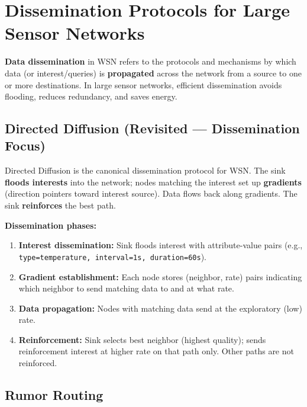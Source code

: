\documentclass[12pt,a4paper]{article}
\begin{document}
\section{Dissemination Protocols for Large Sensor Networks}

\begin{tcolorbox}[defbox, title={\textbf{Data Dissemination --- Definition}}]
\textbf{Data dissemination} in WSN refers to the protocols and mechanisms by which data (or interest/queries) is \textbf{propagated} across the network from a source to one or more destinations. In large sensor networks, efficient dissemination avoids flooding, reduces redundancy, and saves energy.
\end{tcolorbox}

\subsection{Directed Diffusion (Revisited --- Dissemination Focus)}

Directed Diffusion is the canonical dissemination protocol for WSN. The sink \textbf{floods interests} into the network; nodes matching the interest set up \textbf{gradients} (direction pointers toward interest source). Data flows back along gradients. The sink \textbf{reinforces} the best path.

\textbf{Dissemination phases:}
\begin{enumerate}[leftmargin=*, itemsep=3pt]
  \item \textbf{Interest dissemination:} Sink floods interest with attribute-value pairs (e.g., \texttt{type=temperature, interval=1s, duration=60s}).
  \item \textbf{Gradient establishment:} Each node stores (neighbor, rate) pairs indicating which neighbor to send matching data to and at what rate.
  \item \textbf{Data propagation:} Nodes with matching data send at the exploratory (low) rate.
  \item \textbf{Reinforcement:} Sink selects best neighbor (highest quality); sends reinforcement interest at higher rate on that path only. Other paths are not reinforced.
\end{enumerate}

\subsection{Rumor Routing}
\end{document}
